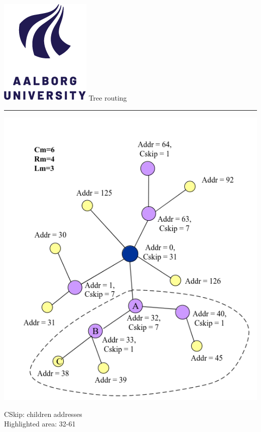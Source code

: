 \documentclass[aspectratio=1610,17pt,utf8]{beamer}
\newcommand{\regularframe}[1]{\color{black}\includegraphics[width=.05\textwidth]{figures/aau.png} #1\\\hrule}
\begin{document}
\begin{frame}{\regularframe{Tree routing}}
    \begin{minipage}{.45\textwidth}
        \includegraphics[width=\textwidth]{figures/tree-routing.png}
    \end{minipage}
    \begin{minipage}{.45\textwidth}
        CSkip: children addresses\\
        Highlighted area: 32-61
    \end{minipage}
\end{frame}
\end{document}
